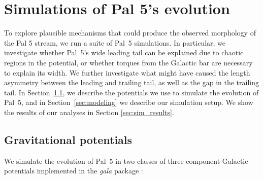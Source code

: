 \documentclass[twocolumn]{aastex62}
\newcommand{\package}[1]{\textsl{#1}}
\newcommand{\sa}[1]{{\color{magenta} SP: #1}}
\begin{document}
\section{Simulations of Pal 5's evolution}
\label{sec:sim}
To explore plausible mechanisms that could produce the observed morphology of the Pal 5 stream, we run a suite of Pal~5 simulations.
In particular, we investigate whether Pal~5's wide leading tail can be explained due to chaotic regions in the potential, or whether torques from the Galactic bar are necessary to explain its width. We further investigate what might have caused the length asymmetry between the leading and trailing tail, as well as the gap in the trailing tail.
In Section~\ref{sec:potential}, we describe the potentials we use to simulate the evolution of Pal~5, and in Section~\ref{sec:modeling} we describe our simulation setup.
We show the results of our analyses in Section \ref{sec:sim_results}.

\subsection{Gravitational potentials}
\label{sec:potential}
We simulate the evolution of Pal~5 in two classes of three-component Galactic potentials implemented in the  \package{gala} package \citep{gala}:
\end{document}
